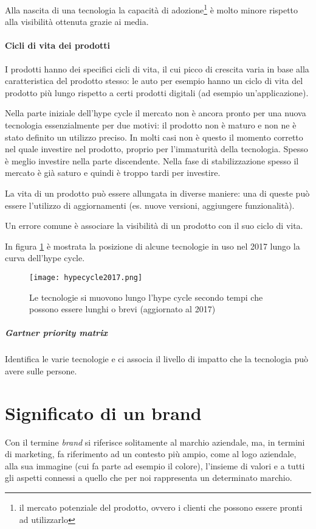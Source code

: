 Alla nascita di una tecnologia la capacità di adozione\footnote{il mercato
potenziale del prodotto, ovvero i clienti che possono essere pronti ad
utilizzarlo} è molto minore rispetto alla visibilità ottenuta grazie ai media.

\paragraph*{Cicli di vita dei prodotti} I prodotti hanno dei specifici cicli di
vita, il cui picco di crescita varia in base alla caratteristica del prodotto
stesso: le auto per esempio hanno un ciclo di vita del prodotto più lungo
rispetto a certi prodotti digitali (ad esempio un'applicazione).

Nella parte iniziale dell'hype cycle il mercato non è ancora pronto per una
nuova tecnologia essenzialmente per due motivi: il prodotto non è maturo e non
ne è stato definito un utilizzo preciso. In molti casi non è questo il momento
corretto nel quale investire nel prodotto, proprio per l'immaturità della
tecnologia. Spesso è meglio investire nella parte discendente. Nella fase di
stabilizzazione spesso il mercato è già saturo e quindi è troppo tardi per
investire.

La vita di un prodotto può essere allungata in diverse maniere:
una di queste può essere l'utilizzo di aggiornamenti (es. nuove versioni,
aggiungere funzionalità).

Un errore comune è associare la visibilità di un prodotto con il suo ciclo di
vita.

In figura \ref{fig:hypecycle2017} è mostrata la posizione di alcune tecnologie
in uso nel 2017 lungo la curva dell'hype cycle.

\begin{figure}[H]
\centering
\texttt{[image: hypecycle2017.png]}
\caption[Hype Cycle 2017]{Le tecnologie si muovono lungo l'hype cycle secondo
tempi che possono essere lunghi o brevi (aggiornato al 2017)}
\label{fig:hypecycle2017}
\end{figure}

\subparagraph*{Gartner priority matrix} Identifica le varie tecnologie e ci
associa il livello di impatto che la tecnologia può avere sulle persone.

\section{Significato di un brand}
Con il termine \textit{brand} si riferisce solitamente al marchio aziendale,
ma, in termini di marketing, fa riferimento ad un contesto più ampio, come al
logo aziendale, alla sua immagine (cui fa parte ad esempio il colore),
l'insieme di valori e a tutti gli aspetti connessi a quello che per noi
rappresenta un determinato marchio.

